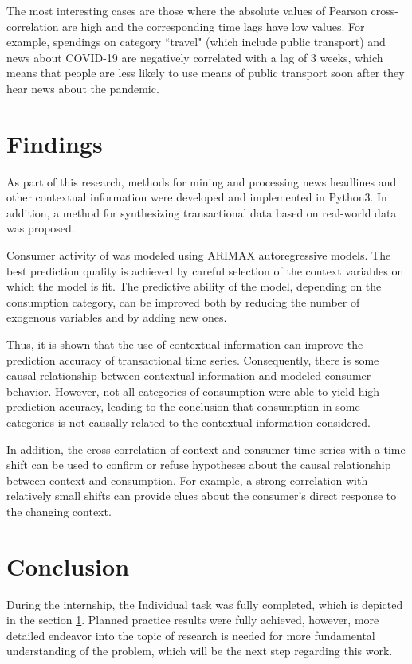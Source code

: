 \documentclass[13pt, a4paper]{article}
\begin{document}
The most interesting cases are those where the absolute values of Pearson cross-correlation are high and the corresponding time lags have low values. For example, spendings on category ``travel" (which include public transport) and news about COVID-19 are negatively correlated with a lag of 3 weeks, which means that people are less likely to use means of public transport soon after they hear news about the pandemic.

\section{Findings} \label{f}

As part of this research, methods for mining and processing news headlines and other contextual information were developed and implemented in Python3. In addition, a method for synthesizing transactional data based on real-world data was proposed. 

Consumer activity of was modeled using ARIMAX autoregressive models. The best prediction quality is achieved by careful selection of the context variables on which the model is fit. The predictive ability of the model, depending on the consumption category, can be improved both by reducing the number of exogenous variables and by adding new ones. 

Thus, it is shown that the use of contextual information can improve the prediction accuracy of transactional time series. Consequently, there is some causal relationship between contextual information and modeled consumer behavior. However, not all categories of consumption were able to yield high prediction accuracy, leading to the conclusion that consumption in some categories is not causally related to the contextual information considered.

In addition, the cross-correlation of context and consumer time series with a time shift can be used to confirm or refuse hypotheses about the causal relationship between context and consumption. For example, a strong correlation with relatively small shifts can provide clues about the consumer's direct response to the changing context. 

\section{Conclusion}

During the internship, the Individual task was fully completed, which is depicted in the section \ref{f}. Planned practice results were fully achieved, however, more detailed endeavor into the topic of research is needed for more fundamental understanding of the problem, which will be the next step regarding this work.
\end{document}
